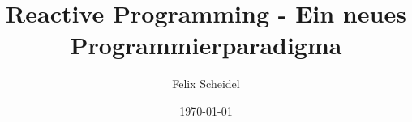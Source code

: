 \documentclass[a4paper,12pt,headsepline]{report}
\title{Reactive Programming - Ein neues Programmierparadigma}
\author{Felix Scheidel}
\date{\today}
\begin{document}

 
 
 
 
 	
 
\tableofcontents %

\pagestyle{plain} %



	

		
	
	
	



	
	
\listoffigures

\listoftables

\renewcommand{\lstlistlistingname}{Listingverzeichnis}
\lstlistoflistings
	
\end{document}
